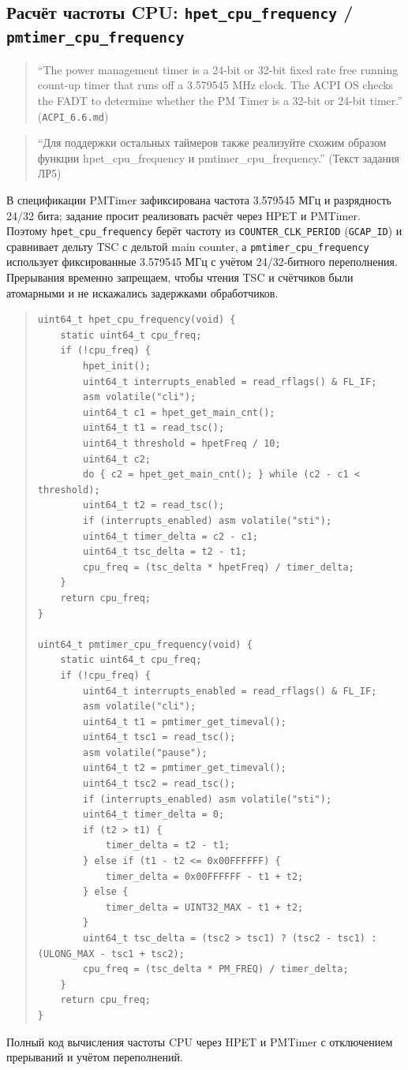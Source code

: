 \documentclass[a4paper,12pt]{article}
\begin{document}
\subsection{Расчёт частоты CPU: \texttt{hpet\_cpu\_frequency} / \texttt{pmtimer\_cpu\_frequency}}
\begin{quote}
``The power management timer is a 24-bit or 32-bit fixed rate free running count-up timer that runs off a 3.579545 MHz clock. The ACPI OS checks the FADT to determine whether the PM Timer is a 32-bit or 24-bit timer.'' (\texttt{ACPI\_6.6.md})
\end{quote}
\begin{quote}
``Для поддержки остальных таймеров также реализуйте схожим образом функции hpet_cpu_frequency и pmtimer_cpu_frequency.'' (Текст задания ЛР5)
\end{quote}
В спецификации PMTimer зафиксирована частота 3.579545 МГц и разрядность 24/32 бита; задание просит реализовать расчёт через HPET и PMTimer. Поэтому \texttt{hpet\_cpu\_frequency} берёт частоту из \texttt{COUNTER\_CLK\_PERIOD} (\texttt{GCAP\_ID}) и сравнивает дельту TSC с дельтой main counter, а \texttt{pmtimer\_cpu\_frequency} использует фиксированные 3.579545 МГц с учётом 24/32-битного переполнения. Прерывания временно запрещаем, чтобы чтения TSC и счётчиков были атомарными и не искажались задержками обработчиков.

\begin{quote}\begin{verbatim}
uint64_t hpet_cpu_frequency(void) {
    static uint64_t cpu_freq;
    if (!cpu_freq) {
        hpet_init();
        uint64_t interrupts_enabled = read_rflags() & FL_IF;
        asm volatile("cli");
        uint64_t c1 = hpet_get_main_cnt();
        uint64_t t1 = read_tsc();
        uint64_t threshold = hpetFreq / 10;
        uint64_t c2;
        do { c2 = hpet_get_main_cnt(); } while (c2 - c1 < threshold);
        uint64_t t2 = read_tsc();
        if (interrupts_enabled) asm volatile("sti");
        uint64_t timer_delta = c2 - c1;
        uint64_t tsc_delta = t2 - t1;
        cpu_freq = (tsc_delta * hpetFreq) / timer_delta;
    }
    return cpu_freq;
}

uint64_t pmtimer_cpu_frequency(void) {
    static uint64_t cpu_freq;
    if (!cpu_freq) {
        uint64_t interrupts_enabled = read_rflags() & FL_IF;
        asm volatile("cli");
        uint64_t t1 = pmtimer_get_timeval();
        uint64_t tsc1 = read_tsc();
        asm volatile("pause");
        uint64_t t2 = pmtimer_get_timeval();
        uint64_t tsc2 = read_tsc();
        if (interrupts_enabled) asm volatile("sti");
        uint64_t timer_delta = 0;
        if (t2 > t1) {
            timer_delta = t2 - t1;
        } else if (t1 - t2 <= 0x00FFFFFF) {
            timer_delta = 0x00FFFFFF - t1 + t2;
        } else {
            timer_delta = UINT32_MAX - t1 + t2;
        }
        uint64_t tsc_delta = (tsc2 > tsc1) ? (tsc2 - tsc1) : (ULONG_MAX - tsc1 + tsc2);
        cpu_freq = (tsc_delta * PM_FREQ) / timer_delta;
    }
    return cpu_freq;
}
\end{verbatim}\end{quote}
Полный код вычисления частоты CPU через HPET и PMTimer с отключением прерываний и учётом переполнений.
\end{document}
